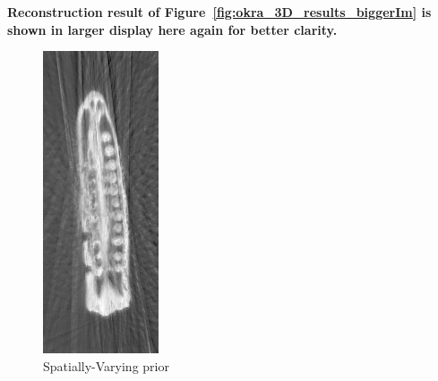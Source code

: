 \documentclass{article}
\begin{document}
\textbf{Reconstruction result of Figure~\ref{fig:okra_3D_results_biggerIm}  is shown in larger display here  again for better clarity.}
\begin{figure}[!h]
\centering
       \includegraphics[width=0.5\columnwidth]{../images/okra/prior_weighted_cropped.png}
\captionsetup{labelformat=empty}
        \caption{\large{Spatially-Varying prior}}
\end{figure}
\newpage

\end{document}
